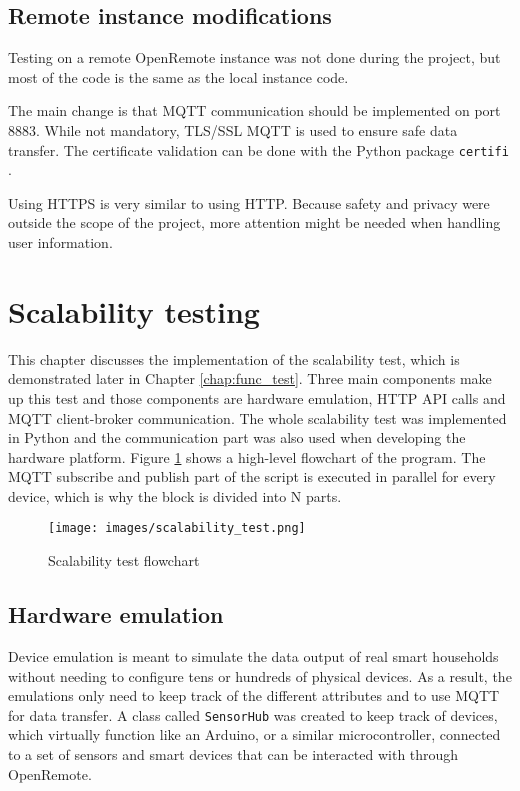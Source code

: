 \subsection{Remote instance modifications}
Testing on a remote OpenRemote instance was not done during the project, but most of the code is the same as the local instance code.

The main change is that MQTT communication should be implemented on port 8883. While not mandatory, TLS/SSL MQTT is used to ensure safe data transfer. The certificate validation can be done with the Python package \lstinline{certifi} \cite{certifi-pypi}.

Using HTTPS is very similar to using HTTP. Because safety and privacy were outside the scope of the project, more attention might be needed when handling user information.  


\section{Scalability testing}
This chapter discusses the implementation of the scalability test, which is demonstrated later in Chapter \ref{chap:func_test}. Three main components make up this test and those components are hardware emulation, HTTP API calls and MQTT client-broker communication. The whole scalability test was implemented in Python and the communication part was also used when developing the hardware platform. Figure \ref{fig:scalability_test} shows a high-level flowchart of the program. The MQTT subscribe and publish part of the script is executed in parallel for every device, which is why the block is divided into N parts.

\begin{figure}
    \centering
    \texttt{[image: images/scalability\_test.png]}
    \caption{Scalability test flowchart}
    \label{fig:scalability_test}
\end{figure}

\subsection{Hardware emulation} \label{chap:hardware-emulation}
Device emulation is meant to simulate the data output of real smart households without needing to configure tens or hundreds of physical devices. As a result, the emulations only need to keep track of the different attributes and to use MQTT for data transfer. A class called \lstinline|SensorHub| was created to keep track of devices, which virtually function like an Arduino, or a similar microcontroller, connected to a set of sensors and smart devices that can be interacted with through OpenRemote.

